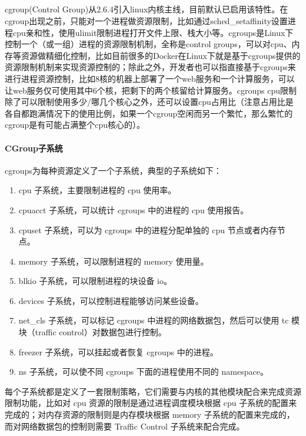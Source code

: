 \documentclass[../../../interview-questions.tex]{subfiles}
\begin{document}
\subsection{\color{red}{容器三把斧之cgroup原理与实现}}

cgroup(Control Group)从2.6.4引入linux内核主线，目前默认已启用该特性。在cgroup出现之前，只能对一个进程做资源限制，比如通过sched\_setaffinity设置进程cpu亲和性，使用ulimit限制进程打开文件上限、栈大小等。cgroups是Linux下控制一个（或一组）进程的资源限制机制，全称是control groups，可以对cpu、内存等资源做精细化控制，比如目前很多的Docker在Linux下就是基于cgroups提供的资源限制机制来实现资源控制的；除此之外，开发者也可以指直接基于cgroups来进行进程资源控制，比如8核的机器上部署了一个web服务和一个计算服务，可以让web服务仅可使用其中6个核，把剩下的两个核留给计算服务。cgroups cpu限制除了可以限制使用多少/哪几个核心之外，还可以设置cpu占用比（注意占用比是各自都跑满情况下的使用比例，如果一个cgroup空闲而另一个繁忙，那么繁忙的cgroup是有可能占满整个cpu核心的）。

\paragraph{CGroup子系统}

cgroups为每种资源定义了一个子系统，典型的子系统如下：

\begin{enumerate}
    \item {cpu 子系统，主要限制进程的 cpu 使用率。}
    \item {cpuacct 子系统，可以统计 cgroups 中的进程的 cpu 使用报告。}
    \item {cpuset 子系统，可以为 cgroups 中的进程分配单独的 cpu 节点或者内存节点。}
    \item {memory 子系统，可以限制进程的 memory 使用量。}
    \item {blkio 子系统，可以限制进程的块设备 io。}
    \item {devices 子系统，可以控制进程能够访问某些设备。}
    \item {net\_cls 子系统，可以标记 cgroups 中进程的网络数据包，然后可以使用 tc 模块（traffic control）对数据包进行控制。}
    \item {freezer 子系统，可以挂起或者恢复 cgroups 中的进程。}
    \item {ns 子系统，可以使不同 cgroups 下面的进程使用不同的 namespace。}
\end{enumerate}

每个子系统都是定义了一套限制策略，它们需要与内核的其他模块配合来完成资源限制功能，比如对 cpu 资源的限制是通过进程调度模块根据 cpu 子系统的配置来完成的；对内存资源的限制则是内存模块根据 memory 子系统的配置来完成的，而对网络数据包的控制则需要 Traffic Control 子系统来配合完成。
\end{document}
